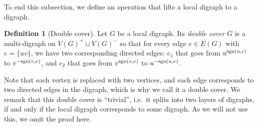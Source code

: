 \documentclass[reqno,11pt]{amsart}
\numberwithin{equation}{section}
\theoremstyle{definition}
\newtheorem{definition}[theorem]{Definition}
\theoremstyle{remark}
\begin{document}
To end this subsection, we define an operation that lifts a local digraph to a digraph.

\begin{definition}[Double cover]\label{def:double-cover}
    Let $G$ be a local digraph.
    Its \emph{double cover} $\overline{G}$ is a multi-digraph on $V(G)^+\sqcup V(G)^-$ so that for every edge $e\in E(G)$ with $e=\{uv\}$, we have two corresponding directed edges: $e_1$ that goes from $u^{\textup{sgn}(u,e)}$ to $v^{-\textup{sgn}(v,e)}$, and $e_2$ that goes from $v^{\textup{sgn}(v,e)}$ to $u^{-\textup{sgn}(u,e)}$.
\end{definition}

Note that each vertex is replaced with two vertices, and each edge corresponds to two directed edges in the digraph, which is why we call it a double cover.
We remark that this double cover is ``trivial'', i.e.\ it splits into two layers of digraphs, if and only if the local digraph corresponds to some digraph.
As we will not use this, we omit the proof here.
\end{document}
